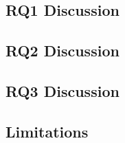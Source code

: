 \subsection{RQ1 Discussion}


\subsection{RQ2 Discussion}


\subsection{RQ3 Discussion}


\subsection{Limitations}
